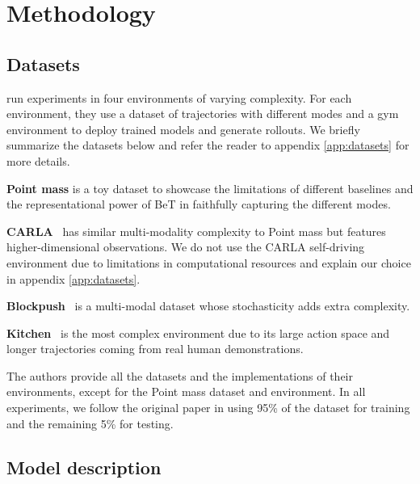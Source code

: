 \section{Methodology}

\subsection{Datasets}\label{sec:dataset}

\citet{shafiullah2022behavior} run experiments in four environments of varying complexity.
For each environment, they use a dataset of trajectories with different modes and a gym \cite{gym} environment to deploy trained models and generate rollouts.
We briefly summarize the datasets below and refer the reader to appendix \ref{app:datasets} for more details.

\textbf{Point mass} is a toy dataset to showcase the limitations of different baselines and the representational power of BeT in faithfully capturing the different modes.

\textbf{CARLA}~\cite{dosovitskiy_carla_2017} has similar multi-modality complexity to Point mass but features higher-dimensional observations.
We do not use the CARLA self-driving environment \cite{dosovitskiy_carla_2017} due to limitations in computational resources and explain our choice in appendix \ref{app:datasets}.

\textbf{Blockpush}~\cite{florence_implicit_2021} is a multi-modal dataset whose stochasticity adds extra complexity.

\textbf{Kitchen}~\cite{gupta_relay_2019} is the most complex environment due to its large action space and longer trajectories coming from real human demonstrations.

The authors provide all the datasets and the implementations of their environments, except for the Point mass dataset and environment.
In all experiments, we follow the original paper in using 95\% of the dataset for training and the remaining 5\% for testing. 

\subsection{Model description}\label{sec:model-desc}

